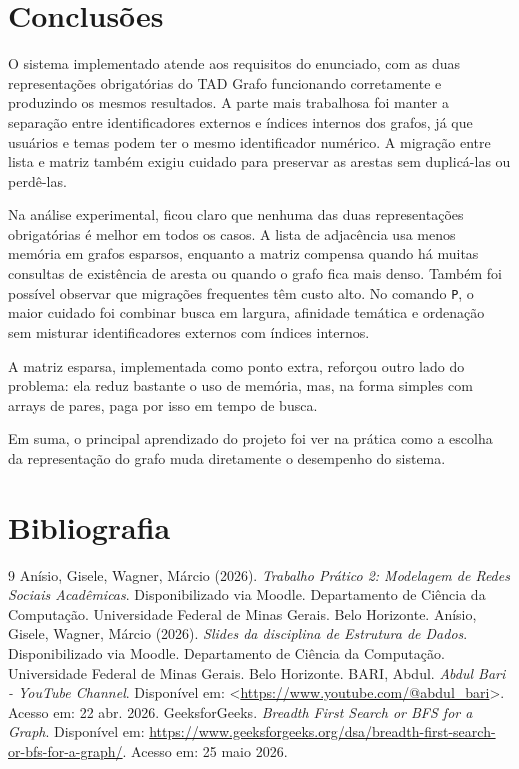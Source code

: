 \documentclass[12pt,a4paper]{article}
\begin{document}
\section{Conclusões}

O sistema implementado atende aos requisitos do enunciado, com as duas representações
obrigatórias do TAD Grafo funcionando corretamente e produzindo os mesmos resultados. A parte
mais trabalhosa foi manter a separação entre identificadores externos e índices internos
dos grafos, já que usuários e temas podem ter o mesmo identificador numérico. A migração
entre lista e matriz também exigiu cuidado para preservar as arestas sem duplicá-las ou
perdê-las.

Na análise experimental, ficou claro que nenhuma das duas representações obrigatórias é melhor em
todos os casos. A lista de adjacência usa menos memória em grafos esparsos, enquanto a
matriz compensa quando há muitas consultas de existência de aresta ou quando o grafo
fica mais denso. Também foi possível observar que migrações frequentes têm custo alto.
No comando \texttt{P}, o maior cuidado foi combinar busca em largura, afinidade temática
e ordenação sem misturar identificadores externos com índices internos.

A matriz esparsa, implementada como ponto extra, reforçou outro lado do problema: ela
reduz bastante o uso de memória, mas, na forma simples com arrays de pares, paga por
isso em tempo de busca.

Em suma, o principal aprendizado do projeto foi ver na prática como a escolha da
representação do grafo muda diretamente o desempenho do sistema.

\section{Bibliografia}
\begin{thebibliography}{9}
Anísio, Gisele, Wagner, Márcio (2026). \textit{Trabalho Prático 2: Modelagem de Redes Sociais Acadêmicas}. Disponibilizado via Moodle. Departamento de Ciência da Computação. Universidade Federal de Minas Gerais. Belo Horizonte.
Anísio, Gisele, Wagner, Márcio (2026). \textit{Slides da disciplina de Estrutura de Dados}. Disponibilizado via Moodle. Departamento de Ciência da Computação. Universidade Federal de Minas Gerais. Belo Horizonte.
BARI, Abdul. \textit{Abdul Bari - YouTube Channel}. Disponível em: <\url{https://www.youtube.com/@abdul_bari}>. Acesso em: 22 abr. 2026.
GeeksforGeeks. \textit{Breadth First Search or BFS for a Graph}.
Disponível em: \url{https://www.geeksforgeeks.org/dsa/breadth-first-search-or-bfs-for-a-graph/}.
Acesso em: 25 maio 2026.
\end{thebibliography}
\end{document}
